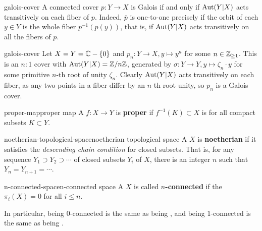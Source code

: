 \begin{example}{galois-cover}
    A connected cover $p : Y \to X$ is Galois if and only if $\textup{Aut}(Y|X)$ acts transitively on each fiber of $p$. Indeed, $\overline{p}$ is one-to-one precisely if the orbit of each $y \in Y$ is the whole fiber $p^{-1}(p(y))$, that is, if $\textup{Aut}(Y|X)$ acts transitively on all the fibers of $p$.
\end{example}

\begin{example}{galois-cover}
    Let $X = Y = \mathbb{C} - \{ 0 \}$ and $p_n : Y \to X, y \mapsto y^n$ for some $n \in \mathbb{Z}_{\ge 1}$. This is an $n : 1$ cover with $\textup{Aut}(Y|X) = \mathbb{Z}/n\mathbb{Z}$, generated by $\sigma : Y \to Y, y \mapsto \zeta_n \cdot y$ for some primitive $n$-th root of unity $\zeta_n$. Clearly $\textup{Aut}(Y|X)$ acts transitively on each fiber, as any two points in a fiber differ by an $n$-th root unity, so $p_n$ is a Galois cover.
\end{example}

\begin{topic}{proper-map}{proper map}
    A  $f : X \to Y$ is \textbf{proper} if $f^{-1}(K) \subset X$ is  for all compact subsets $K \subset Y$.
\end{topic}

\begin{topic}{noetherian-topological-space}{noetherian topological space}
    A  $X$ is \textbf{noetherian} if it satisfies the \textit{descending chain condition} for closed subsets. That is, for any sequence $Y_1 \supset Y_2 \supset \cdots$ of closed subsets $Y_i$ of $X$, there is an integer $n$ such that $Y_n = Y_{n + 1} = \cdots$.
\end{topic}

\begin{topic}{n-connected-space}{n-connected space}
    A  $X$ is called \textbf{$n$-connected} if the  $\pi_i(X) = 0$ for all $i \le n$.
    
    In particular, being $0$-connected is the same as being , and being $1$-connected is the same as being .
\end{topic}

